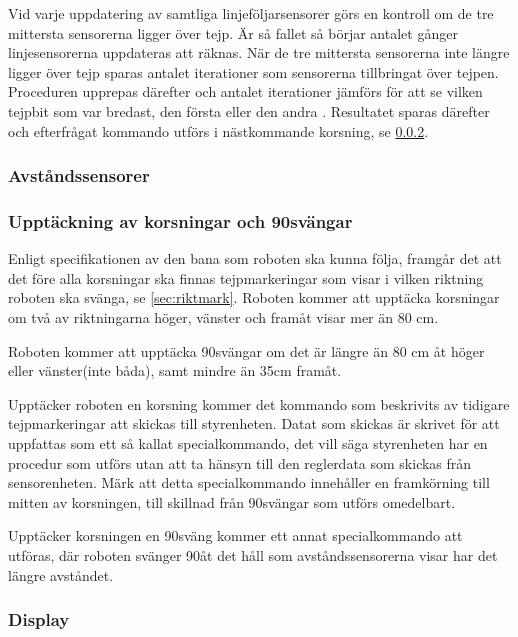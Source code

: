 Vid varje uppdatering av samtliga linjeföljarsensorer görs en kontroll om de 
tre mittersta sensorerna ligger över tejp. Är så fallet så börjar antalet 
gånger linjesensorerna uppdateras att räknas. När de tre mittersta sensorerna 
inte längre ligger över tejp sparas antalet iterationer som sensorerna 
tillbringat över tejpen. Proceduren upprepas därefter och antalet iterationer 
jämförs för att se vilken tejpbit som var bredast, den första eller den andra
. Resultatet sparas därefter och efterfrågat kommando utförs i nästkommande 
korsning, se \ref{sec:upptackkorsning}.


\subsubsection{Avståndssensorer}

\subsubsection{Upptäckning av korsningar och 90\degree svängar}
\label{sec:upptackkorsning}
Enligt specifikationen av den bana som roboten ska kunna följa, framgår det 
att det före alla korsningar ska finnas tejpmarkeringar som visar i vilken 
riktning roboten ska svänga, se \ref{sec:riktmark}. Roboten kommer att 
upptäcka korsningar om två av riktningarna höger, vänster och framåt visar 
mer än 80 cm.

Roboten kommer att upptäcka 90\degree svängar om det är längre än 80 cm åt 
höger eller vänster(inte båda), samt mindre än 35cm framåt.

Upptäcker roboten en korsning kommer det kommando som beskrivits av tidigare 
tejpmarkeringar att skickas till styrenheten. Datat som skickas är skrivet 
för att uppfattas som ett så kallat specialkommando, det vill säga 
styrenheten har en procedur som utförs utan att ta hänsyn till den reglerdata 
som skickas från sensorenheten. Märk att detta specialkommando innehåller en 
framkörning till mitten av korsningen, till skillnad från 90\degree svängar 
som utförs omedelbart.

Upptäcker korsningen en 90\degree sväng kommer ett annat specialkommando att 
utföras, där roboten svänger 90\degree åt det håll som avståndssensorerna 
visar har det längre avståndet.


\subsubsection{Display}


